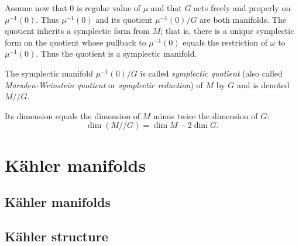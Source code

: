\documentclass{worksheetclass}
\begin{document}
        Assume now that $0$ is regular value of $\mu$ and that $G$ acts freely and properly on $\mu^{-1}(0)$. Thus $\mu^{-1}(0)$ and its quotient $\mu^{-1}(0)/G$ are both manifolds. The quotient inherits a symplectic form from $M$; that is, there is a unique symplectic form on the quotient whose pullback to $\mu^{-1}(0)$ equals the restriction of $\omega$ to $\mu^{-1}(0)$. Thus the quotient is a symplectic manifold.

        \begin{defn}
            The symplectic manifold $\mu^{-1}(0)/G$ is called \emph{symplectic quotient} (also called \emph{Marsden-Weinstein quotient} or \emph{symplectic reduction}) of $M$ by $G$ and is denoted $M//G$\index{$//$}.
        \end{defn}
        Its dimension equals the dimension of $M$ minus twice the dimension of $G$:
        \begin{equation}
            \dim(M//G)=\dim M-2\dim G.
        \end{equation}

\section{Kähler manifolds}

\subsection{Kähler manifolds}

    \subsection{Kähler structure}
\end{document}
